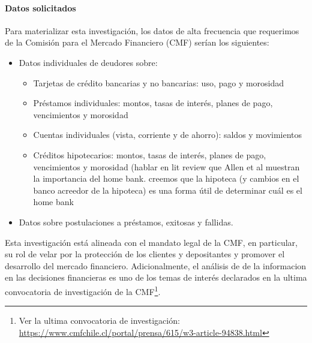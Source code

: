\documentclass[11pt]{article}
\theoremstyle{plain}
\theoremstyle{plain}
\begin{document}
\paragraph{Datos solicitados}


Para materializar esta investigación, 
los datos de alta frecuencia que requerimos de la Comisión para el Mercado Financiero (CMF) serían los siguientes:


\begin{itemize}
    \item Datos individuales de deudores sobre:
    \begin{itemize}
        \item Tarjetas de crédito bancarias y no bancarias: uso, pago y morosidad
        \item Préstamos individuales: montos, tasas de interés, planes de pago, vencimientos y morosidad
        \item Cuentas individuales (vista, corriente y de ahorro): saldos y movimientos
        \item Créditos hipotecarios: montos, tasas de interés, planes de pago, vencimientos y morosidad (hablar en lit review que Allen et al muestran la importancia del home bank. creemos que la hipoteca (y cambios en el banco acreedor de la hipoteca) es una forma útil de determinar cuál es el home bank
    \end{itemize}
    \item Datos sobre postulaciones a préstamos, exitosas y fallidas.
\end{itemize}


Esta investigación está alineada con el mandato legal de la CMF, en particular, su rol de velar por la protección de los clientes y depositantes y promover el desarrollo del mercado financiero. Adicionalmente, el análisis de de la informacion en las decisiones financieras es uno de los temas de interés declarados en la ultima convocatoria de investigación de la CMF\footnote{Ver la ultima convocatoria de investigación: \href{https://www.cmfchile.cl/portal/prensa/615/w3-article-94838.html}{https://www.cmfchile.cl/portal/prensa/615/w3-article-94838.html} }.

\end{document}
